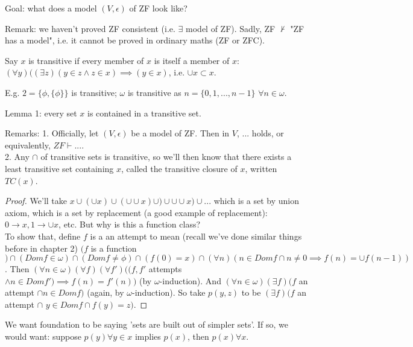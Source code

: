 \documentclass[a4paper]{article}
\begin{document}
Goal: what does a model $(V,\epsilon)$ of ZF look like?

Remark: we haven't proved ZF consistent (i.e. $\exists$ model of ZF). Sadly, ZF $\not\vdash$ "ZF has a model", i.e. it cannot be proved in ordinary maths (ZF or ZFC).

Say $x$ is transitive if every member of $x$ is itself a member of $x$: $(\forall y)((\exists z)(y \in z \wedge z \in x) \implies (y \in x)$, i.e. $\cup x \subset x$.

E.g. $2=\{\phi,\{\phi\}\}$ is transitive; $\omega$ is transitive as $n=\{0,1,...,n-1\}$ $\forall n \in \omega$.

Lemma 1: every set $x$ is contained in a transitive set.

Remarks: 1. Officially, let $(V,\epsilon)$ be a model of ZF. Then in $V$, ... holds, or equivalently, $ZF \vdash ...$.\\
2. Any $\cap$ of transitive sets is transitive, so we'll then know that there exists a least transitive set containing $x$, called the transitive closure of $x$, written $TC(x)$.
\begin{proof}
We'll take $x \cup (\cup x) \cup(\cup\cup x) \cup)\cup\cup\cup x) \cup ...$ which is a set by union axiom, which is a set by replacement (a good example of replacement): $0 \to x, 1 \to \cup x$, etc. But why is this a function class?\\
To show that, define $f$ is a an attempt to mean (recall we've done similar things before in chapter 2) $(f$ is a function $) \cap (Dom f \in \omega) \cap (Dom f \neq \phi) \cap (f (0) = x) \cap (\forall n) (n \in Dom f \cap n \neq 0 \implies f(n) = \cup f(n-1))$. Then $(\forall n\in\omega) (\forall f) (\forall f') ((f,f'$ attempts $\wedge n \in Dom f') \implies f(n) = f'(n))$ (by $\omega$-induction). And $(\forall n \in \omega) (\exists f) (f$ an attempt $\cap n \in Dom f)$ (again, by $\omega$-induction). So take $p(y,z)$ to be $(\exists f) (f$ an attempt $\cap$ $y \in Dom f \cap f(y) = z)$.
\end{proof}

We want foundation to be saying 'sets are built out of simpler sets'. If so, we would want: suppose $p(y) \forall y \in x$ implies $p(x)$, then $p(x) \forall x$.
\end{document}
